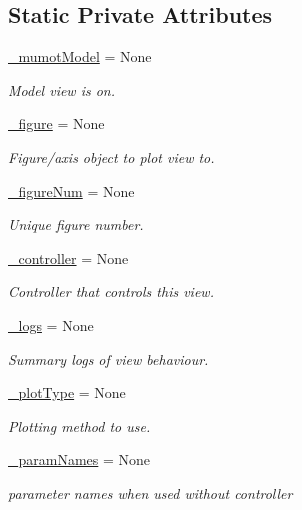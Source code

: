 \subsection*{Static Private Attributes}
\begin{DoxyCompactItemize}
\item 
\hyperlink{class_mu_mo_t_1_1_mu_mo_tview_aeacd9541246371f0db5cc3e3779762fa}{\+\_\+mumot\+Model} = None
\begin{DoxyCompactList}\small\item\em Model view is on. \end{DoxyCompactList}\item 
\hyperlink{class_mu_mo_t_1_1_mu_mo_tview_abf6d9f6be3898e307415d4598cde264d}{\+\_\+figure} = None
\begin{DoxyCompactList}\small\item\em Figure/axis object to plot view to. \end{DoxyCompactList}\item 
\hyperlink{class_mu_mo_t_1_1_mu_mo_tview_a5748371a5f2e09033908d21bb12f94c0}{\+\_\+figure\+Num} = None
\begin{DoxyCompactList}\small\item\em Unique figure number. \end{DoxyCompactList}\item 
\hyperlink{class_mu_mo_t_1_1_mu_mo_tview_a15f56ca9811d1e67d721fa64f9b0dc1e}{\+\_\+controller} = None
\begin{DoxyCompactList}\small\item\em Controller that controls this view. \end{DoxyCompactList}\item 
\hyperlink{class_mu_mo_t_1_1_mu_mo_tview_ac0ad5d0ca27f2668c0676334ee73ff52}{\+\_\+logs} = None
\begin{DoxyCompactList}\small\item\em Summary logs of view behaviour. \end{DoxyCompactList}\item 
\hyperlink{class_mu_mo_t_1_1_mu_mo_tview_a5feff4ca83ee97d6e09874496a4975d4}{\+\_\+plot\+Type} = None
\begin{DoxyCompactList}\small\item\em Plotting method to use. \end{DoxyCompactList}\item 
\hyperlink{class_mu_mo_t_1_1_mu_mo_tview_ac7734326ac8dbbf9bd0d2c9838633195}{\+\_\+param\+Names} = None
\begin{DoxyCompactList}\small\item\em parameter names when used without controller \end{DoxyCompactList}\item 

\end{DoxyCompactItemize}
